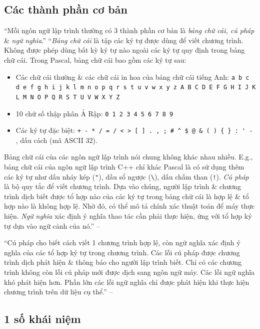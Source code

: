 \documentclass[oneside]{book}
\numberwithin{equation}{section}
\begin{document}
\subsection{Các thành phần cơ bản}
``Mỗi ngôn ngữ lập trình thường có 3 thành phần cơ bản là \textit{bảng chữ cái, cú pháp} \& \textit{ngữ nghĩa}.'' ``\textit{Bảng chữ cái} là tập các ký tự được dùng để viết chương trình. Không được phép dùng bất kỳ ký tự nào ngoài các ký tự quy định trong bảng chữ cái. Trong Pascal, bảng chữ cái bao gồm các ký tự sau:
\begin{itemize}
	\item Các chữ cái thường \& các chữ cái in hoa của bảng chữ cái tiếng Anh: \texttt{a b c d e f g h i j k l m n o p q r s t u v w x y z A B C D E F G H I J K L M N O P Q R S T U V W X Y Z}
	\item 10 chữ số thập phân Ả Rập: \texttt{0 1 2 3 4 5 6 7 8 9}
	\item Các ký tự đặc biệt: \verb|+ - * / = / < > [ ] . , ; # ^ $ @ & ( ) { } : ' - |, dấu cách (mã ASCII 32).
\end{itemize}
Bảng chữ cái của các ngôn ngữ lập trình nói chung không khác nhau nhiều. E.g., bảng chữ cái của ngôn ngữ lập trình C++ chỉ khác Pascal là có sử dụng thêm các ký tự như dấu nháy kép (\verb|"|), dấu sổ ngược (\verb|\|), dấu chấm than (\verb|!|). \textit{Cú pháp} là bộ quy tắc để viết chương trình. Dựa vào chúng, người lập trình \& chương trình dịch biết được tổ hợp nào của các ký tự trong bảng chữ cái là hợp lệ \& tổ hợp nào là không hợp lệ. Nhờ đó, có thể mô tả chính xác thuật toán để máy thực hiện. \textit{Ngữ nghĩa} xác định ý nghĩa thao tác cần phải thực hiện, ứng với tổ hợp ký tự dựa vào ngữ cảnh của nó.'' -- \cite[p. 9]{SGK_Tin_Hoc_11}

``Cú pháp cho biết cách viết 1 chương trình hợp lệ, còn ngữ nghĩa xác định ý nghĩa của các tổ hợp ký tự trong chương trình. Các lỗi cú pháp được chương trình dịch phát hiện \& thông báo cho người lập trình biết. Chỉ có các chương trình không còn lỗi cú pháp mới được dịch sang ngôn ngữ máy. Các lỗi ngữ nghĩa khó phát hiện hơn. Phần lớn các lỗi ngữ nghĩa chỉ được phát hiện khi thực hiện chương trình trên dữ liệu cụ thể.'' -- \cite[p. 10]{SGK_Tin_Hoc_11}

\subsection{1 số khái niệm}
\end{document}
